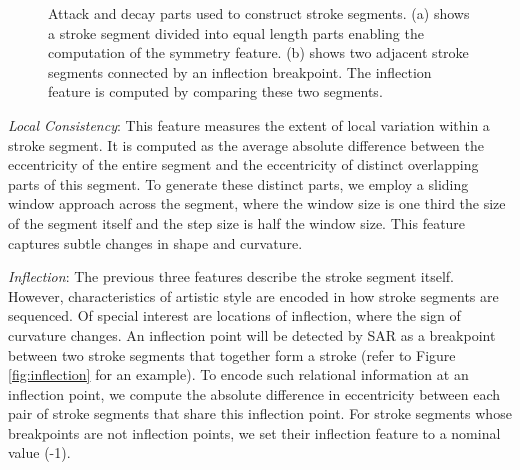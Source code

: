 \begin{figure}[ht]
\centering
{}
\vspace{-3mm}
\caption{Attack and decay parts used to construct stroke segments. (a) shows a stroke segment divided into equal length parts enabling the computation of the symmetry feature. (b) shows two adjacent stroke segments connected by an inflection breakpoint. The inflection feature is computed by comparing these two segments.}\vspace{-4mm}
\end{figure}



\noindent \emph{Local Consistency}: This feature measures the extent of local variation within a stroke segment. It is computed as the average absolute difference between the eccentricity of the entire segment and the eccentricity of distinct overlapping parts of this segment. To generate these distinct parts, we employ a sliding window approach across the segment, where the window size is one third the size of the segment itself and the step size is half the window size. This feature captures subtle changes in shape and curvature.


\noindent \emph{Inflection}: The previous three features describe the stroke segment itself. However, characteristics of artistic style are encoded in how stroke segments are sequenced. Of special interest are locations of inflection, where the sign of curvature changes. An inflection point will be detected by SAR as a breakpoint between two stroke segments that together form a stroke (refer to Figure \ref{fig:inflection} for an example). To encode such relational information at an inflection point, we compute the absolute difference in eccentricity between each pair of stroke segments that share this inflection point. For stroke segments whose breakpoints are not inflection points, we set their inflection feature to a nominal value (-1).


